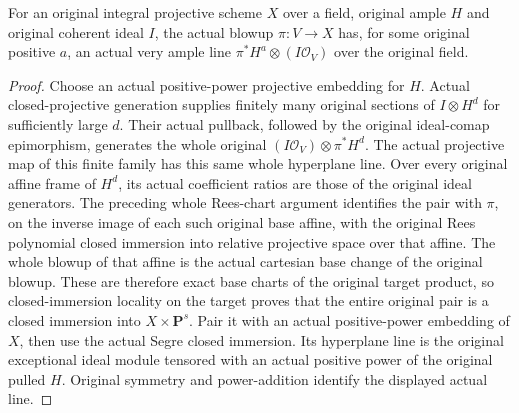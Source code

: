 \begin{lemma}
\label{lem:kn-nadel-nef-big-global-rees-positive}
\notready
For an original integral projective scheme $X$ over a field, original ample $H$
and original coherent ideal $I$, the actual blowup $\pi:V\to X$ has,
for some original positive $a$, an actual very ample line
$\pi^*H^a\otimes(I\mathcal O_V)$ over the original field.
\end{lemma}
\begin{proof}
Choose an actual positive-power projective embedding for $H$. Actual
closed-projective generation supplies finitely many original sections
of $I\otimes H^d$ for sufficiently large $d$. Their actual pullback,
followed by the original ideal-comap epimorphism, generates the whole
original $(I\mathcal O_V)\otimes\pi^*H^d$. The actual projective map
of this finite family has this same whole hyperplane line. Over every
original affine frame of $H^d$, its actual coefficient ratios are those
of the original ideal generators. The preceding whole Rees-chart argument
identifies the pair with $\pi$, on the inverse image of each such
original base affine, with the original Rees polynomial closed immersion
into relative projective space over that affine. The whole blowup of that
affine is the actual cartesian base change of the original blowup. These
are therefore exact base charts of the original target product, so
closed-immersion locality on the target proves that the entire original
pair is a closed immersion into $X\times\mathbf P^s$. Pair it with an actual
positive-power embedding of $X$, then use the actual Segre closed
immersion. Its hyperplane line is the original exceptional ideal module
tensored with an actual positive power of the original pulled $H$.
Original symmetry and power-addition identify the displayed actual line.
\end{proof}

